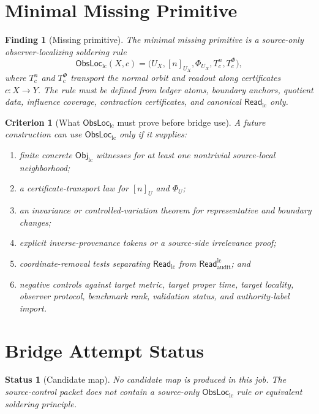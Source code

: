 \documentclass[11pt]{article}
\newcommand{\ObjLC}{\mathsf{Obj}_{\mathrm{lc}}}
\newcommand{\ReadLC}{\mathsf{Read}_{\mathrm{lc}}}
\newcommand{\ReadAudit}{\mathsf{Read}_{\mathrm{audit}}^{\mathrm{lc}}}
\newcommand{\ObsLocLC}{\mathsf{ObsLoc}_{\mathrm{lc}}}
\newtheorem{criterion}{Criterion}
\newtheorem{finding}{Finding}
\newtheorem{status}{Status}
\begin{document}
\section{Minimal Missing Primitive}

\begin{finding}[Missing primitive]
The minimal missing primitive is a source-only observer-localizing
soldering rule
\[
    \ObsLocLC(X,c)
    =
    \bigl(U_X,[n]_{U_X},\Phi_{U_X},
    T_c^{n},T_c^{\Phi}\bigr),
\]
where \(T_c^{n}\) and \(T_c^{\Phi}\) transport the normal orbit and
readout along certificates \(c:X\to Y\). The rule must be defined from
ledger atoms, boundary anchors, quotient data, influence coverage,
contraction certificates, and canonical \(\ReadLC\) only.
\end{finding}

\begin{criterion}[What \(\ObsLocLC\) must prove before bridge use]
A future construction can use \(\ObsLocLC\) only if it supplies:
\begin{enumerate}
    \item finite concrete \(\ObjLC\) witnesses for at least one
    nontrivial source-local neighborhood;
    \item a certificate-transport law for \([n]_{U}\) and \(\Phi_U\);
    \item an invariance or controlled-variation theorem for
    representative and boundary changes;
    \item explicit inverse-provenance tokens or a source-side
    irrelevance proof;
    \item coordinate-removal tests separating \(\ReadLC\) from
    \(\ReadAudit\); and
    \item negative controls against target metric, target proper time,
    target locality, observer protocol, benchmark rank, validation
    status, and authority-label import.
\end{enumerate}
\end{criterion}

\section{Bridge Attempt Status}

\begin{status}[Candidate map]
No candidate map is produced in this job. The source-control packet
does not contain a source-only \(\ObsLocLC\) rule or equivalent
soldering principle.
\end{status}
\end{document}
